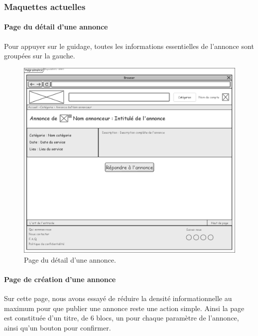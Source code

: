 \documentclass[a4paper,11pt]{article}
\begin{document}
\subsubsection{Maquettes actuelles}

\paragraph{Page du détail d'une annonce}

Pour appuyer sur le guidage, toutes les informations essentielles de l'annonce sont groupées sur la gauche.


\begin{figure}[H]
  \includegraphics[width=\linewidth]{images/maquette-detail-annonce.png}
  \caption{Page du détail d'une annonce.}
  \label{fig:maquette-detail-annonce}
\end{figure}
\newpage

\paragraph{Page de création d'une annonce}

Sur cette page, nous avons essayé de réduire la densité informationnelle au maximum pour que publier
une annonce reste une action simple. Ainsi la page est constituée d'un titre, de 6 blocs, un pour chaque paramètre
de l'annonce, ainsi qu'un bouton pour confirmer.
\end{document}
